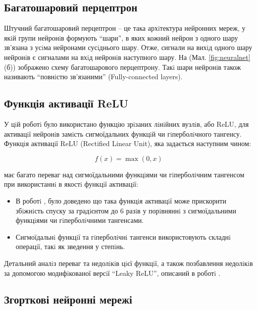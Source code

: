 \subsection{Багатошаровий перцептрон}

Штучний багатошаровий перцептрон -- це така архiтектура нейронних мереж, у якiй групи нейронiв формують \enquote{шари}, в яких кожний нейрон з одного шару зв'язана з усiма нейронами сусiднього шару. Отже, сигнали на вихiд одного шару нейронiв є сигналами на вхiд нейронiв наступного шару. На (Мал. \ref{fig:neuralnet} (б)) зображено схему багатошарового перцептрону. Такi шари нейронiв також називають \enquote{повнiстю зв'язаними} (Fully-connected layers).

\subsection{Функція активації ReLU}

У цiй роботi було використано функцiю зрiзаних лiнiйних вузлiв, або ReLU, для активацiї нейронiв замiсть сигмоїдальних функцiй чи гiперболiчного тангенсу. Функцiя активацiї ReLU (Rectified Linear Unit), яка задається наступним чином:

\begin{equation*}
f(x) = \max(0, x)
\end{equation*}

має багато переваг над сигмоїдальними функцiями чи гiперболiчним тангенсом при використаннi в якостi функцiї активацiї:

\begin{itemize}
	\item В роботi \parencite{nn:krizhevsky_imagenet}, було доведено що така функцiя активацiї може прискорити збiжнiсть спуску за градiєнтом до 6 разiв у порiвняннi з сигмоїдальними функцiями чи гiперболiчними тангенсами.
	
	\item Сигмоїдальнi функцiї та гiперболiчнi тангенси використовують складнi операцiї, такi як зведення у степiнь.
\end{itemize}

Детальний аналiз переваг та недолiкiв цiєї функцiї, а також позбавлення недолiкiв за допомогою модифiкованої версiї \enquote{Leaky ReLU}, описаний в роботi \parencite{nn:kaiming}.


\subsection{Згорткові нейронні мережі}

